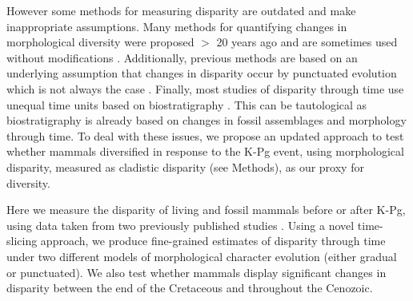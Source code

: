 \documentclass[12pt,letterpaper]{article}
\begin{document}

However some methods for measuring disparity are outdated and make inappropriate assumptions.
Many methods for quantifying changes in morphological diversity were proposed $>$ 20 years ago \citep{Foote01071994,Wills1994} and are sometimes used without modifications \citep[e.g.,][]{brusatte50,Brusatte12092008,cisneros2010,thorneresetting2011,prentice2011,brusattedinosaur2012,toljagictriassic-jurassic2013,ruta2013,bentonmodels2014,bensonfaunal2014}.
Additionally, previous methods are based on an underlying assumption that changes in disparity occur by punctuated evolution \citep[e.g.][]{Wesley-Hunt2005} which is not always the case \citep{Hunt21042015}.
Finally, most studies of disparity through time use unequal time units based on biostratigraphy \citep{Brusatte12092008,brusattedinosaur2012,toljagictriassic-jurassic2013}. 
This can be tautological as biostratigraphy is already based on changes in fossil assemblages and morphology through time.
To deal with these issues, we propose an updated approach to test whether mammals diversified in response to the K-Pg event, using morphological disparity, measured as cladistic disparity (see Methods), as our proxy for diversity.

Here we measure the disparity of living and fossil mammals before or after K-Pg, using data taken from two previously published studies \citep{Slater2012MEE,beckancient2014}. 
Using a novel time-slicing approach, we produce fine-grained estimates of disparity through time under two different models of morphological character evolution (either gradual or punctuated). 
We also test whether mammals display significant changes in disparity between the end of the Cretaceous and throughout the Cenozoic.
\end{document}
